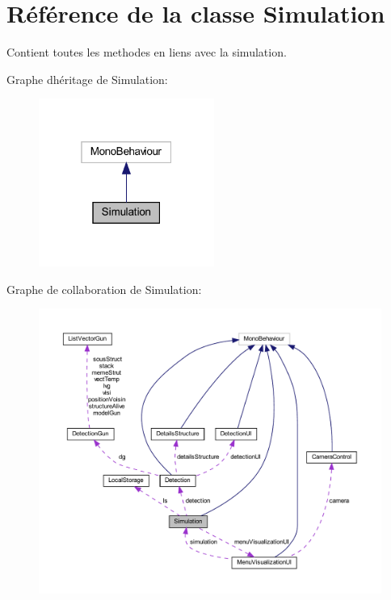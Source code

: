 \hypertarget{class_simulation}{}\section{Référence de la classe Simulation}
\label{class_simulation}


Contient toutes les methodes en liens avec la simulation.  




Graphe d\textquotesingle{}héritage de Simulation\+:\nopagebreak
\begin{figure}[H]
\begin{center}
\leavevmode
\includegraphics[width=163pt]{class_simulation__inherit__graph}
\end{center}
\end{figure}


Graphe de collaboration de Simulation\+:
\nopagebreak
\begin{figure}[H]
\begin{center}
\leavevmode
\includegraphics[width=350pt]{class_simulation__coll__graph}
\end{center}
\end{figure}
